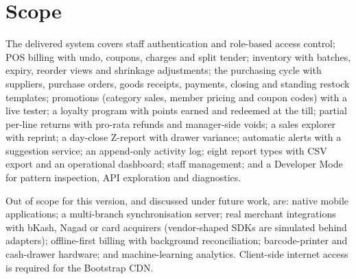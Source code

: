\documentclass[12pt,a4paper]{report}
\begin{document}
\section{Scope}
The delivered system covers staff authentication and role-based access control; POS
billing with undo, coupons, charges and split tender; inventory with batches, expiry,
reorder views and shrinkage adjustments; the purchasing cycle with suppliers, purchase
orders, goods receipts, payments, closing and standing restock templates; promotions
(category sales, member pricing and coupon codes) with a live tester; a loyalty program
with points earned and redeemed at the till; partial per-line returns with pro-rata
refunds and manager-side voids; a sales explorer with reprint; a day-close Z-report with
drawer variance; automatic alerts with a suggestion service; an append-only activity log;
eight report types with CSV export and an operational dashboard; staff management; and a
Developer Mode for pattern inspection, API exploration and diagnostics.

Out of scope for this version, and discussed under future work, are: native mobile
applications; a multi-branch synchronisation server; real merchant integrations with bKash,
Nagad or card acquirers (vendor-shaped SDKs are simulated behind adapters); offline-first
billing with background reconciliation; barcode-printer and cash-drawer hardware; and
machine-learning analytics. Client-side internet access is required for the Bootstrap CDN.
\end{document}
